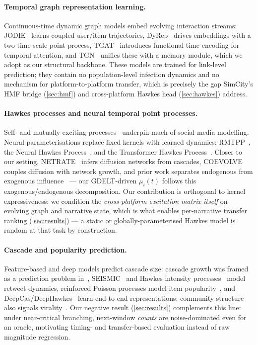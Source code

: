 \documentclass[11pt]{article}
\begin{document}
\paragraph{Temporal graph representation learning.}
Continuous-time dynamic graph models embed evolving interaction streams:
JODIE~\citep{kumar2019predicting} learns coupled user/item trajectories,
DyRep~\citep{trivedi2019dyrep} drives embeddings with a two-time-scale point
process, TGAT~\citep{xu2020tgat} introduces functional time encoding for
temporal attention, and TGN~\citep{rossi2020temporal} unifies these with a
memory module, which we adopt as our structural backbone. These models are
trained for link-level prediction; they contain no population-level infection
dynamics and no mechanism for platform-to-platform transfer, which is precisely
the gap SimCity's HMF bridge (\cref{sec:hmf}) and cross-platform Hawkes head
(\cref{sec:hawkes}) address.

\paragraph{Hawkes processes and neural temporal point processes.}
Self- and mutually-exciting processes~\citep{hawkes1971spectra} underpin much of
social-media modelling. Neural parameterisations replace fixed kernels with
learned dynamics: RMTPP~\citep{du2016rmtpp}, the Neural Hawkes
Process~\citep{mei2017neural}, and the Transformer Hawkes
Process~\citep{zuo2020transformer}. Closer to our setting,
NETRATE~\citep{gomez2011netrate} infers diffusion networks from cascades,
COEVOLVE~\citep{farajtabar2017coevolve} couples diffusion with network growth,
and prior work separates endogenous from exogenous
influence~\citep{myers2012external} --- our GDELT-driven $\mu_i(t)$ follows
this exogenous/endogenous decomposition.
Our contribution is orthogonal to kernel expressiveness: we condition the
\emph{cross-platform excitation matrix itself} on evolving graph and narrative
state, which is what enables per-narrative transfer ranking
(\cref{sec:results}) --- a static or globally-parameterised Hawkes model is
random at that task by construction.

\paragraph{Cascade and popularity prediction.}
Feature-based and deep models predict cascade size: cascade growth was framed
as a prediction problem in~\citep{cheng2014cascades},
SEISMIC~\citep{zhao2015seismic} and Hawkes intensity
processes~\citep{rizoiu2017hip,kobayashi2016tideh} model retweet dynamics,
reinforced Poisson processes model item popularity~\citep{shen2014rpp}, and
DeepCas/DeepHawkes~\citep{li2017deepcas,cao2017deephawkes} learn end-to-end
representations; community structure also signals virality~\citep{weng2013virality}.
Our negative result (\cref{sec:results}) complements this line: under
near-critical branching, next-window \emph{counts} are noise-dominated even for
an oracle, motivating timing- and transfer-based evaluation instead of raw
magnitude regression.
\end{document}
